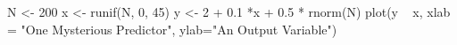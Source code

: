 \begin{Schunk}
\begin{Sinput}
 N <- 200
 x <- runif(N, 0, 45)
 y <- 2 + 0.1 *x + 0.5 * rnorm(N)
 plot(y ~ x, xlab = "One Mysterious Predictor", ylab="An Output Variable")
\end{Sinput}
\end{Schunk}
